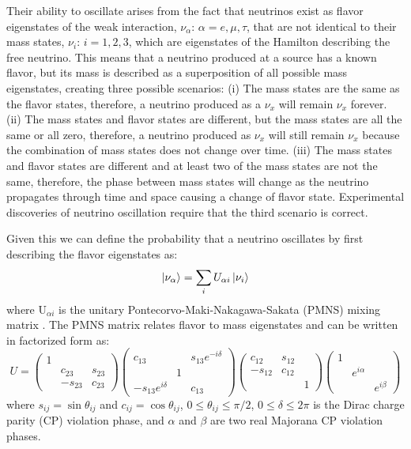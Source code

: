 Their ability to oscillate arises from the fact that neutrinos exist as flavor eigenstates of the weak interaction, $\nu_\alpha$: $\alpha = e, \mu, \tau$, that are not identical to their mass states, $\nu_i$: $i = 1, 2, 3$, which are eigenstates of the Hamilton describing the free neutrino.
This means that a neutrino produced at a source has a known flavor, but its mass is described as a superposition of all possible mass eigenstates, creating three possible scenarios:
(i) The mass states are the same as the flavor states, therefore, a neutrino produced as a $\nu_x$ will remain $\nu_x$ forever. 
(ii) The mass states and flavor states are different, but the mass states are all the same or all zero, therefore, a neutrino produced as $\nu_x$ will still remain $\nu_x$ because the combination of mass states does not change over time. 
(iii) The mass states and flavor states are different and at least two of the mass states are not the same, therefore, the phase between mass states will change as the neutrino propagates through time and space causing a change of flavor state.
Experimental discoveries of neutrino oscillation require that the third scenario is correct.

Given this we can define the probability that a neutrino oscillates by first describing the flavor eigenstates as:
\begin{equation}
	\ket{\nu_\alpha} = \sum_{i}U_{\alpha i}\ket{\nu_i}
\end{equation}
where U$_{\alpha i}$ is the unitary Pontecorvo-Maki-Nakagawa-Sakata (PMNS) mixing matrix \cite{PDG}. 
The PMNS matrix relates flavor to mass eigenstates and can be written in factorized form as:
\begin{equation}	
	U = 
	\begin{pmatrix}
		1 & & \\
		& c_{23} & s_{23} \\
		& -s_{23} & c_{23}
	\end{pmatrix}
	\begin{pmatrix}
		c_{13} & & s_{13}e^{-i\delta} \\
		& 1 &	\\
		-s_{13}e^{i\delta} & & c_{13}
	\end{pmatrix}
	\begin{pmatrix}
		c_{12} & s_{12} & \\
		-s_{12} & c_{12} & \\
		& & 1
	\end{pmatrix}
	\begin{pmatrix}
		1 & & \\
		& e^{i\alpha}  & \\
		& & e^{i\beta}
	\end{pmatrix}
\end{equation}
where $s_{ij} = \sin\theta_{ij}$ and $c_{ij} = \cos\theta_{ij}$, $0 \leq \theta_{ij} \leq \pi/2$, $0 \leq \delta \leq 2\pi$ is the Dirac charge parity (CP) violation phase, and $\alpha$ and $\beta$ are two real Majorana CP violation phases.

